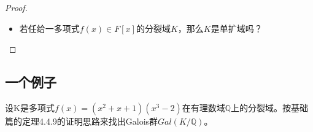 \begin{proof}
	\begin{itemize}
		\item {}
		\par
		若任给一多项式$f(x)\in F[x]$的分裂域$K$，那么$K$是单扩域吗？
	\end{itemize}
\end{proof}









\subsection{一个例子}

\begin{example}
	设K是多项式$f(x)=(x^{2}+x+1)(x^{3}-2)$在有理数域$\mathbb{Q}$上的分裂域。按基础篇的定理4.4.9的证明思路来找出Galois群$Gal(K/\mathbb{Q})$。
\end{example}
